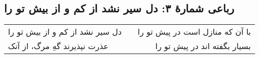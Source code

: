 \begin{center}
\section*{رباعی شمارهٔ ۳: دل سیر نشد از کم و از بیش تو را }
\label{sec:003}
\begin{longtable}{l p{0.5cm} r}
دل سیر نشد از کم و از بیش تو را 
&&
با آن که منازل است در پیش تو را 
\\
عذرت نپذیرند گهِ مرگ، از آنک
&&
بسیار بگفته اند در پیش تو را 
\\
\end{longtable}
\end{center}
